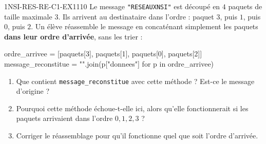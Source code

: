 
\begin{exercice}{1NSI-RES-RE-C1-EX1}{1}{10}
Le message \lstinline{"RESEAUXNSI"} est découpé en $4$ paquets de taille maximale $3$.
Ils arrivent au destinataire dans l'ordre : paquet $3$, puis $1$, puis $0$, puis $2$.
Un élève réassemble le message en concaténant simplement les paquets
\textbf{dans leur ordre d'arrivée}, sans les trier :
\begin{python}
ordre_arrivee = [paquets[3], paquets[1], paquets[0], paquets[2]]
message_reconstitue = "".join(p["donnees"] for p in ordre_arrivee)
\end{python}
\begin{enumerate}
  \item Que contient \lstinline{message_reconstitue} avec cette méthode ? Est-ce le message d'origine ?
  \item Pourquoi cette méthode échoue-t-elle ici, alors qu'elle fonctionnerait si les paquets arrivaient dans l'ordre $0,1,2,3$ ?
  \item Corriger le réassemblage pour qu'il fonctionne quel que soit l'ordre d'arrivée.
\end{enumerate}
\end{exercice}

